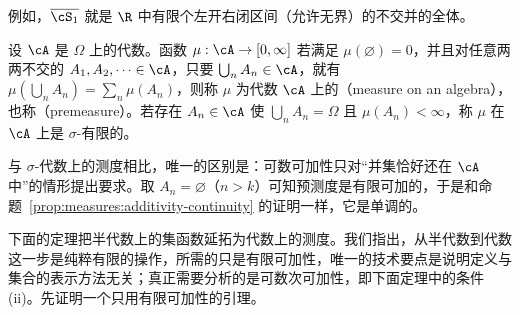 例如，$\overline{\cS_1}$ 就是 $\R$ 中有限个左开右闭区间（允许无界）的不交并的全体。


\begin{definition}[代数上的测度]\label{def:extension:premeasure}
设 $\cA$ 是 $\Omega$ 上的代数。函数 $\mu:\cA\to[0,\infty]$ 若满足 $\mu(\varnothing)=0$，并且对任意两两不交的 $A_1,A_2,\dots\in\cA$，只要 $\bigcup_nA_n\in\cA$，就有 $\mu(\bigcup_nA_n)=\sum_n\mu(A_n)$，则称 $\mu$ 为代数 $\cA$ 上的（measure on an algebra），也称（premeasure）。若存在 $A_n\in\cA$ 使 $\bigcup_nA_n=\Omega$ 且 $\mu(A_n)<\infty$，称 $\mu$ 在 $\cA$ 上是 $\sigma$-有限的。
\end{definition}

与 $\sigma$-代数上的测度相比，唯一的区别是：可数可加性只对“并集恰好还在 $\cA$ 中”的情形提出要求。取 $A_n=\varnothing$（$n>k$）可知预测度是有限可加的，于是和命题~\ref{prop:measures:additivity-continuity} 的证明一样，它是单调的。

下面的定理把半代数上的集函数延拓为代数上的测度。我们指出，从半代数到代数这一步是纯粹有限的操作，所需的只是有限可加性，唯一的技术要点是说明定义与集合的表示方法无关；真正需要分析的是可数次可加性，即下面定理中的条件 (ii)。先证明一个只用有限可加性的引理。

